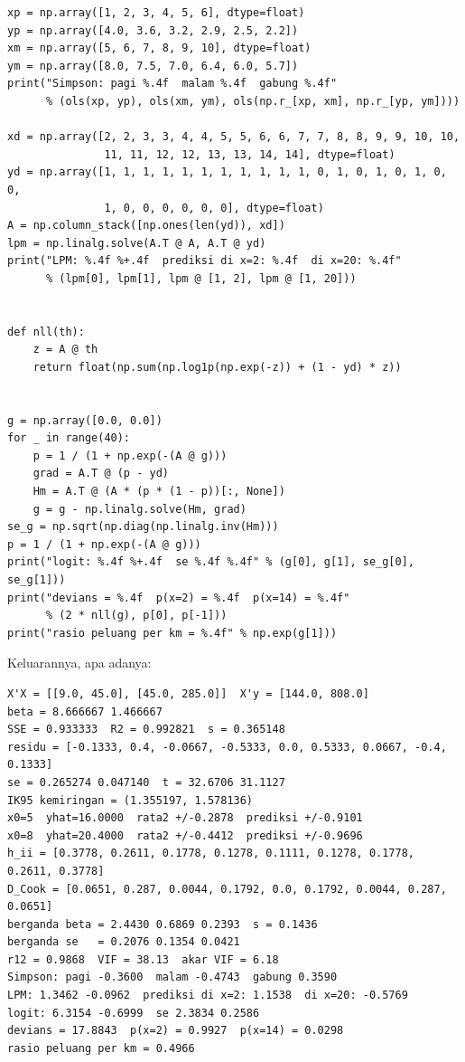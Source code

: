 \begin{lab}
\begin{verbatim}
xp = np.array([1, 2, 3, 4, 5, 6], dtype=float)
yp = np.array([4.0, 3.6, 3.2, 2.9, 2.5, 2.2])
xm = np.array([5, 6, 7, 8, 9, 10], dtype=float)
ym = np.array([8.0, 7.5, 7.0, 6.4, 6.0, 5.7])
print("Simpson: pagi %.4f  malam %.4f  gabung %.4f"
      % (ols(xp, yp), ols(xm, ym), ols(np.r_[xp, xm], np.r_[yp, ym])))

xd = np.array([2, 2, 3, 3, 4, 4, 5, 5, 6, 6, 7, 7, 8, 8, 9, 9, 10, 10,
               11, 11, 12, 12, 13, 13, 14, 14], dtype=float)
yd = np.array([1, 1, 1, 1, 1, 1, 1, 1, 1, 1, 1, 0, 1, 0, 1, 0, 1, 0, 0,
               1, 0, 0, 0, 0, 0, 0], dtype=float)
A = np.column_stack([np.ones(len(yd)), xd])
lpm = np.linalg.solve(A.T @ A, A.T @ yd)
print("LPM: %.4f %+.4f  prediksi di x=2: %.4f  di x=20: %.4f"
      % (lpm[0], lpm[1], lpm @ [1, 2], lpm @ [1, 20]))


def nll(th):
    z = A @ th
    return float(np.sum(np.log1p(np.exp(-z)) + (1 - yd) * z))


g = np.array([0.0, 0.0])
for _ in range(40):
    p = 1 / (1 + np.exp(-(A @ g)))
    grad = A.T @ (p - yd)
    Hm = A.T @ (A * (p * (1 - p))[:, None])
    g = g - np.linalg.solve(Hm, grad)
se_g = np.sqrt(np.diag(np.linalg.inv(Hm)))
p = 1 / (1 + np.exp(-(A @ g)))
print("logit: %.4f %+.4f  se %.4f %.4f" % (g[0], g[1], se_g[0], se_g[1]))
print("devians = %.4f  p(x=2) = %.4f  p(x=14) = %.4f"
      % (2 * nll(g), p[0], p[-1]))
print("rasio peluang per km = %.4f" % np.exp(g[1]))
\end{verbatim}
\end{lab}

Keluarannya, apa adanya:

\begin{verbatim}
X'X = [[9.0, 45.0], [45.0, 285.0]]  X'y = [144.0, 808.0]
beta = 8.666667 1.466667
SSE = 0.933333  R2 = 0.992821  s = 0.365148
residu = [-0.1333, 0.4, -0.0667, -0.5333, 0.0, 0.5333, 0.0667, -0.4, 0.1333]
se = 0.265274 0.047140  t = 32.6706 31.1127
IK95 kemiringan = (1.355197, 1.578136)
x0=5  yhat=16.0000  rata2 +/-0.2878  prediksi +/-0.9101
x0=8  yhat=20.4000  rata2 +/-0.4412  prediksi +/-0.9696
h_ii = [0.3778, 0.2611, 0.1778, 0.1278, 0.1111, 0.1278, 0.1778, 0.2611, 0.3778]
D_Cook = [0.0651, 0.287, 0.0044, 0.1792, 0.0, 0.1792, 0.0044, 0.287, 0.0651]
berganda beta = 2.4430 0.6869 0.2393  s = 0.1436
berganda se   = 0.2076 0.1354 0.0421
r12 = 0.9868  VIF = 38.13  akar VIF = 6.18
Simpson: pagi -0.3600  malam -0.4743  gabung 0.3590
LPM: 1.3462 -0.0962  prediksi di x=2: 1.1538  di x=20: -0.5769
logit: 6.3154 -0.6999  se 2.3834 0.2586
devians = 17.8843  p(x=2) = 0.9927  p(x=14) = 0.0298
rasio peluang per km = 0.4966
\end{verbatim}


